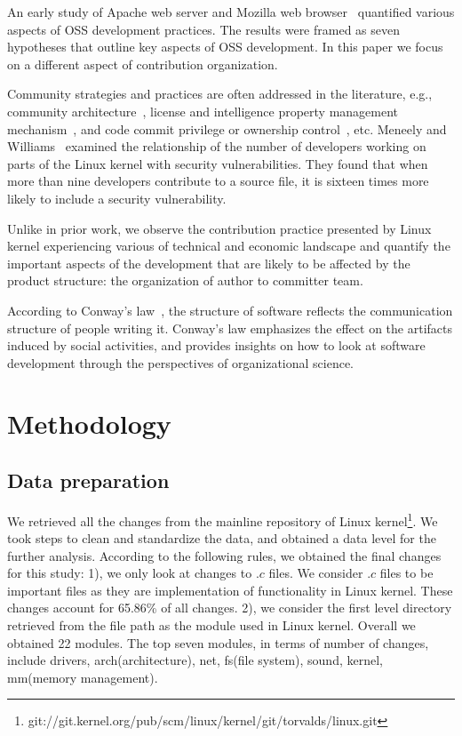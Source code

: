 \documentclass{sig-alternate-05-2015}
\begin{document}
{An early study of Apache web server and Mozilla web browser~\cite{MFH02}
quantified various aspects of OSS development practices. The
results were framed as seven hypotheses that outline key aspects of
OSS development.  In this paper we focus on a different aspect of
 contribution organization.

Community strategies and practices are often addressed in the
literature, e.g., community architecture~\cite{MFH02,YK03}, license
and intelligence property management mechanism~\cite{Hippel03}, and
code commit privilege or ownership control~\cite{MFH02,YK03,KSL03}, etc.
  Meneely  and  Williams~\cite{meneely09}  examined  the  relationship
of  the  number  of  developers  working  on  parts  of  the
Linux kernel with security vulnerabilities.  They found
that when more than nine developers contribute to a source
file, it is sixteen times more likely to include a security vulnerability.

Unlike in prior work, we observe the contribution practice
presented by Linux kernel experiencing various of technical and economic landscape
and quantify the important aspects of the development that are likely
to be affected by the product structure:
 the organization of author to committer team.

According to Conway's law~\cite{conway}, the structure of software reflects
the communication structure of people writing it.
Conway's law emphasizes the effect on the artifacts induced by social activities,
and provides insights on how to look at software development
through the perspectives of organizational science.

\section{Methodology}\label{s:method}
\subsection{Data preparation}
We retrieved all the changes from the mainline repository of Linux
kernel\footnote{git://git.kernel.org/pub/scm/linux/kernel/git/torvalds/linux.git}.
We took steps to clean and standardize the data, and obtained a data level for the further analysis.
According to the following rules, we obtained the final changes for this study:
1), we only look at changes to $.c$ files. We consider $.c$ files to be important files as they are implementation of functionality in Linux kernel. These changes account for 65.86\% of all changes.
2), we consider the first level directory retrieved from the file path as the module used in Linux kernel. Overall we obtained 22 modules. The top seven modules, in terms of number of changes, include drivers, arch(architecture), net, fs(file system), sound, kernel, mm(memory management).

}
\end{document}
